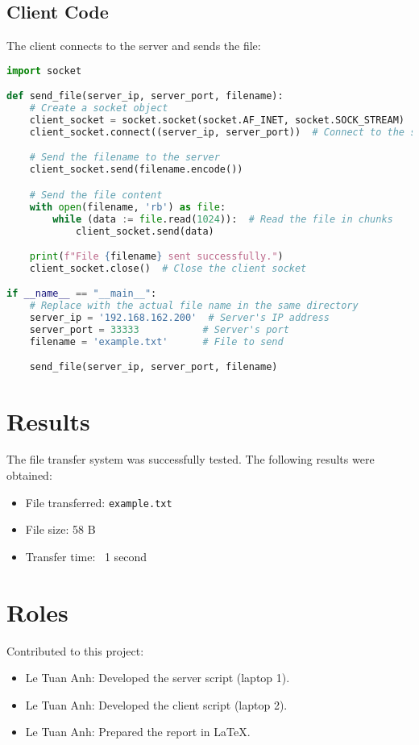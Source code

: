 \documentclass{article}
\begin{document}
\subsection{Client Code}
The client connects to the server and sends the file:
\begin{lstlisting}[language=Python]
import socket

def send_file(server_ip, server_port, filename):
    # Create a socket object
    client_socket = socket.socket(socket.AF_INET, socket.SOCK_STREAM)
    client_socket.connect((server_ip, server_port))  # Connect to the server

    # Send the filename to the server
    client_socket.send(filename.encode())

    # Send the file content
    with open(filename, 'rb') as file:
        while (data := file.read(1024)):  # Read the file in chunks
            client_socket.send(data)

    print(f"File {filename} sent successfully.")
    client_socket.close()  # Close the client socket

if __name__ == "__main__":
    # Replace with the actual file name in the same directory
    server_ip = '192.168.162.200'  # Server's IP address
    server_port = 33333           # Server's port
    filename = 'example.txt'      # File to send

    send_file(server_ip, server_port, filename)
\end{lstlisting}

\section{Results}
The file transfer system was successfully tested. The following results were obtained:
\begin{itemize}
    \item File transferred: \texttt{example.txt}
    \item File size: 58 B
    \item Transfer time: ~1 second
\end{itemize}

\section{Roles}
Contributed to this project:
\begin{itemize}
    \item Le Tuan Anh: Developed the server script (laptop 1).
    \item Le Tuan Anh: Developed the client script (laptop 2).
    \item Le Tuan Anh: Prepared the report in LaTeX.
\end{itemize}
\end{document}
